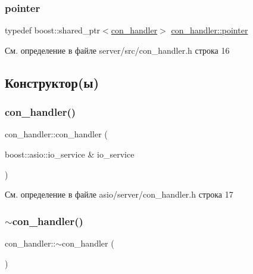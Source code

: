 \subsubsection{\texorpdfstring{pointer}{pointer}\hspace{0.1cm}{\footnotesize\ttfamily [2/2]}}
{\footnotesize\ttfamily typedef boost\+::shared\+\_\+ptr$<$\mbox{\hyperlink{classcon__handler}{con\+\_\+handler}}$>$ \mbox{\hyperlink{classcon__handler_ada4a1b970f9fd8e55460a58cf7f7ce2c}{con\+\_\+handler\+::pointer}}}



См. определение в файле server/src/con\+\_\+handler.\+h строка 16



\subsection{Конструктор(ы)}
\mbox{\label{classcon__handler_a18e7e450430ebe71687a0fd0c79507aa}} 
\subsubsection{\texorpdfstring{con\_handler()}{con\_handler()}\hspace{0.1cm}{\footnotesize\ttfamily [1/2]}}
{\footnotesize\ttfamily con\+\_\+handler\+::con\+\_\+handler (\begin{DoxyParamCaption}\item[{boost\+::asio\+::io\+\_\+service \&}]{io\+\_\+service }\end{DoxyParamCaption})\hspace{0.3cm}{\ttfamily [inline]}}



См. определение в файле asio/server/con\+\_\+handler.\+h строка 17

\mbox{\label{classcon__handler_aa1bc82c764eb633355a52bd77689ed3f}} 
\subsubsection{\texorpdfstring{$\sim$con\_handler()}{~con\_handler()}\hspace{0.1cm}{\footnotesize\ttfamily [1/2]}}
{\footnotesize\ttfamily con\+\_\+handler\+::$\sim$con\+\_\+handler (\begin{DoxyParamCaption}{ }\end{DoxyParamCaption})}




